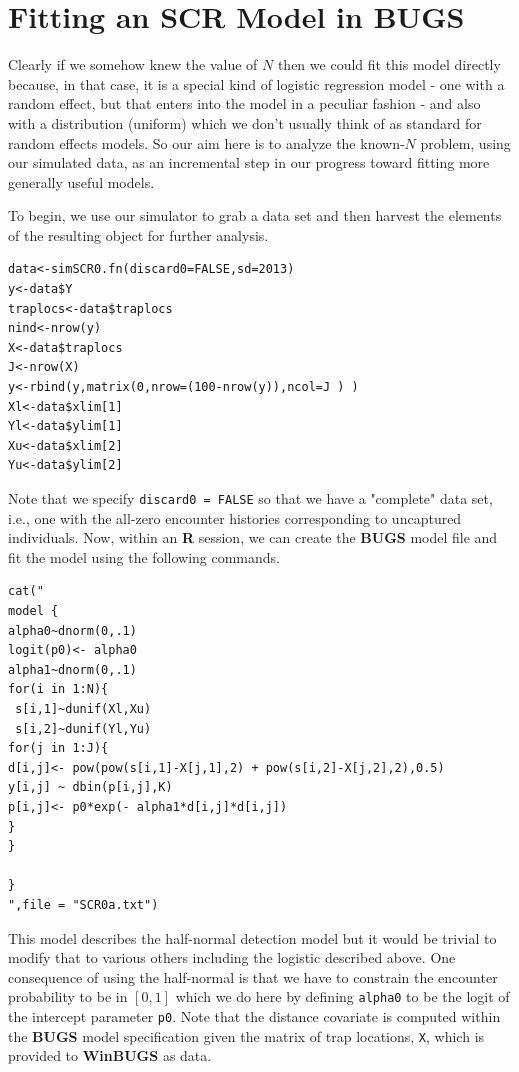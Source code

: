 \section{Fitting an SCR Model in BUGS}
\label{scr0.sec.winbugs1}

Clearly if we somehow knew the value of $N$ then we could fit this
model directly because, in that case, it is a special kind of logistic
regression model - one with a random effect, but that enters into the
model in a peculiar fashion - and also with a distribution (uniform)
which we don't usually think of as standard for random effects models.
So our aim here is to analyze the known-$N$ problem, using our
simulated data, as an incremental step in our progress toward fitting
more generally useful models.

To begin, we use our simulator to grab a data set and then harvest the
elements of the resulting object for further analysis.
\begin{verbatim}
data<-simSCR0.fn(discard0=FALSE,sd=2013)
y<-data$Y
traplocs<-data$traplocs
nind<-nrow(y)
X<-data$traplocs
J<-nrow(X)
y<-rbind(y,matrix(0,nrow=(100-nrow(y)),ncol=J ) )
Xl<-data$xlim[1]
Yl<-data$ylim[1]
Xu<-data$xlim[2]
Yu<-data$ylim[2]
\end{verbatim}

Note that we specify \mbox{\tt discard0 = FALSE} so that we have a
"complete" data set, i.e., one with the all-zero encounter histories
corresponding to uncaptured individuals. Now, within an {\bf R} session, we
can create the {\bf BUGS} model file and fit the model using the following
commands. 
{\small
\begin{verbatim}
cat("
model {
alpha0~dnorm(0,.1)
logit(p0)<- alpha0
alpha1~dnorm(0,.1)
for(i in 1:N){
 s[i,1]~dunif(Xl,Xu)
 s[i,2]~dunif(Yl,Yu)
for(j in 1:J){
d[i,j]<- pow(pow(s[i,1]-X[j,1],2) + pow(s[i,2]-X[j,2],2),0.5)
y[i,j] ~ dbin(p[i,j],K)
p[i,j]<- p0*exp(- alpha1*d[i,j]*d[i,j])
}
}

}
",file = "SCR0a.txt")
\end{verbatim}
}
This model describes the half-normal detection model but it
would be trivial to modify that to various others including the
logistic described above. One consequence of using the half-normal is
that we have to constrain the encounter probability to be in $[0,1]$
which we do here by defining \mbox{\tt alpha0} to be the logit of the
intercept parameter \mbox{\tt p0}. Note that the distance covariate is
computed within the {\bf BUGS} model specification given the matrix of trap
locations, \mbox{\tt X}, which is provided to {\bf WinBUGS} as data.

